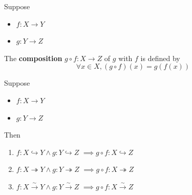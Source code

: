 \begin{definition} \label{an1:def:composition-function}
  Suppose
  \begin{itemize}
    \item $f: X \to Y$
    \item $g: Y \to Z$
  \end{itemize}
  The \textbf{composition} $g \circ f: X \to Z$ of $g$ with $f$ is defined by
  \[
    \forall x \in X, (g \circ f)(x) = g(f(x))
  \]
\end{definition}

\begin{theorem} \label{an1:thm:properties-of-composition-functions}
  Suppose
  \begin{itemize}
    \item $f: X \to Y$
    \item $g: Y \to Z$
  \end{itemize}
  Then
  \begin{enumerate}[label=\textbf{(\Alph*)}]
    \item $f: X \hookrightarrow Y \land g: Y \hookrightarrow Z$ $\implies g \circ f: X \hookrightarrow Z$
    \item $f: X \twoheadrightarrow Y \land g: Y \twoheadrightarrow Z$ $\implies g \circ f: X \twoheadrightarrow Z$
    \item $f: X \xrightarrow{\sim} Y \land g: Y \xrightarrow{\sim} Z$ $\implies g \circ f: X \xrightarrow{\sim} Z$
  \end{enumerate}
\end{theorem}

